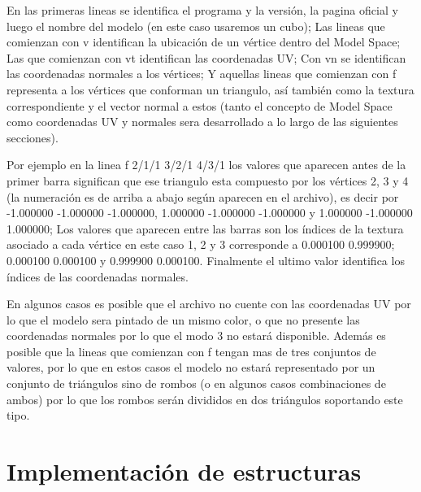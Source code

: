 \documentclass[a4paper]{article}
\newcounter{col}
\begin{document}
En las primeras lineas se identifica el programa y la versión, la pagina oficial y luego el nombre del modelo (en este caso usaremos un cubo); Las lineas que comienzan con v identifican la ubicación de un vértice dentro del Model Space; Las que comienzan con vt identifican las coordenadas UV; Con vn se identifican las coordenadas normales a los vértices; Y aquellas lineas que comienzan con f representa a los vértices que conforman un triangulo, así también como la textura correspondiente y el vector normal a estos (tanto el concepto de Model Space como coordenadas UV y normales sera desarrollado a lo largo de las siguientes secciones).
\par Por ejemplo en la linea f 2/1/1 3/2/1 4/3/1 los valores que aparecen antes de la primer barra significan que ese triangulo esta compuesto por los vértices 2, 3 y 4 (la numeración es de arriba a abajo según aparecen en el archivo), es decir por -1.000000 -1.000000 -1.000000, 1.000000 -1.000000 -1.000000 y 1.000000 -1.000000 1.000000; Los valores que aparecen entre las barras son los índices de la textura asociado a cada vértice en este caso 1, 2 y 3 corresponde a 0.000100 0.999900; 0.000100 0.000100 y 0.999900 0.000100. Finalmente el ultimo valor identifica los índices de las coordenadas normales.
\par En algunos casos es posible que el archivo no cuente con las coordenadas UV por lo que el modelo sera pintado de un mismo color, o que no presente las coordenadas normales por lo que el modo 3 no estará disponible. Además es posible que la lineas que comienzan con f tengan mas de tres conjuntos de valores, por lo que en estos casos el modelo no estará representado por un conjunto de triángulos sino de rombos (o en algunos casos combinaciones de ambos) por lo que los rombos serán divididos en dos triángulos soportando este tipo. 

\section{Implementación de estructuras}
\end{document}
